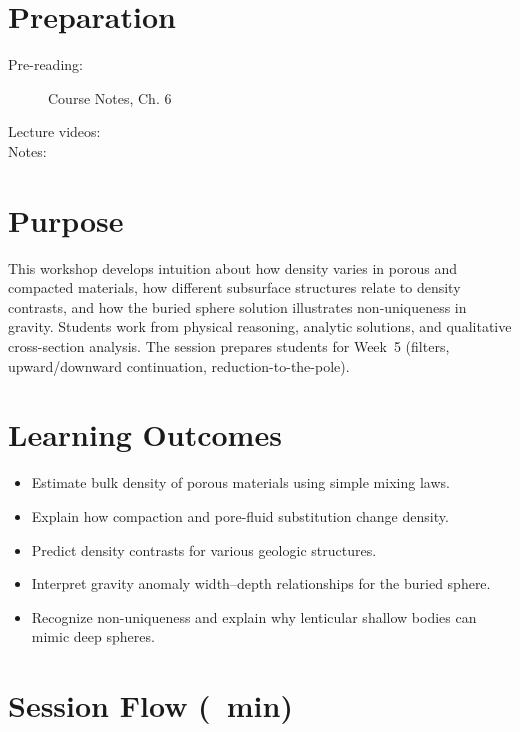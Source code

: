 
\workshopstart

\vspace{-0.75em}
\section*{Preparation}

\begin{description}
  \item[Pre-reading:] Course Notes, Ch. 6
  \item[Lecture videos:]
  \item[Notes:]
\end{description}

\section*{Purpose}
This workshop develops intuition about how density varies in porous and compacted materials, how different subsurface structures relate to density contrasts, and how the buried sphere solution illustrates non-uniqueness in gravity. Students work from physical reasoning, analytic solutions, and qualitative cross-section analysis. The session prepares students for Week~5 (filters, upward/downward continuation, reduction-to-the-pole).

\section*{Learning Outcomes}
\begin{itemize}
  \item Estimate bulk density of porous materials using simple mixing laws.
  \item Explain how compaction and pore-fluid substitution change density.
  \item Predict density contrasts for various geologic structures.
  \item Interpret gravity anomaly width--depth relationships for the buried sphere.
  \item Recognize non-uniqueness and explain why lenticular shallow bodies can mimic deep spheres.
\end{itemize}

\section*{Session Flow (\timelinelength\ min)}

